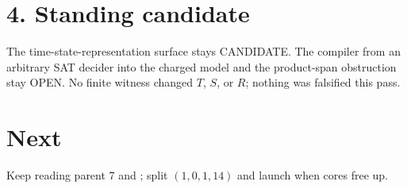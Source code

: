 \documentclass[11pt]{article}
\begin{document}
\section*{4. Standing candidate}
The time-state-representation surface stays CANDIDATE. The compiler from an arbitrary SAT decider into the charged model and the product-span obstruction stay OPEN. No finite witness changed $T$, $S$, or $R$; nothing was falsified this pass.

\section*{Next}
Keep reading parent 7 and ; split $(1,0,1,14)$ and launch  when cores free up.
\end{document}
